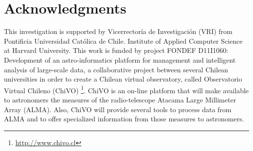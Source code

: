 	\section*{Acknowledgments}
	
	This investigation is supported by Vicerrectoría de Investigaci\'on (VRI) from Pontificia Universidad Cat\'olica de Chile.
	Institute of Applied Computer Science at Harvard University.
	This  work  is  funded  by  project  FONDEF  D11I1060:  Development  of  an  astro-informatics  platform  for management and intelligent analysis of large-scale data, a collaborative project between several Chilean universities in order to create a Chilean virtual observatory, called Observatorio Virtual Chileno (ChiVO)
	\footnote{\url{http://www.chivo.cl}}.
	ChiVO is an on-line platform that will make available to astronomers the measures of the radio-telescope Atacama Large Millimeter Array (ALMA). 
	Also, ChiVO will provide several tools to process data from ALMA and to offer specialized information from those measures to astronomers.
